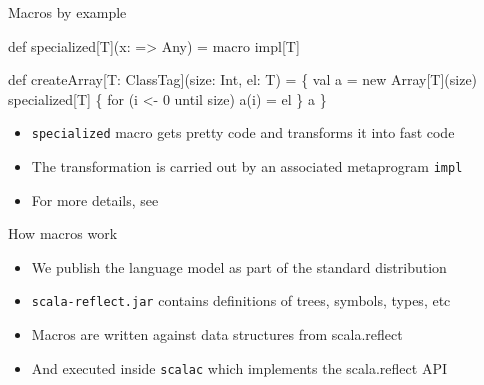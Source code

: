 \documentclass[svgnames,dvipsnames,hyperref={bookmarks=false},usepdftitle=false]{beamer}
\begin{document}
\begin{frame}[fragile]{Macros by example}

\begin{semiverbatim}
\alert{def specialized[T](x: => Any) = macro impl[T]}

def createArray[T: ClassTag](size: Int, el: T) = \{
  val a = new Array[T](size)
  \alert{specialized[T] \{}
    for (i <- 0 until size) a(i) = el
  \alert{\}}
  a
\}

\end{semiverbatim}

\begin{itemize}
\item \texttt{specialized} macro gets pretty code and transforms it into fast code
\item The transformation is carried out by an associated metaprogram \texttt{impl}
\item For more details, see 
\end{itemize}
\end{frame}

\begin{frame}{How macros work}

\begin{itemize}
\item We publish the language model as part of the standard distribution
\item \texttt{scala-reflect.jar} contains definitions of trees, symbols, types, etc
\item Macros are written against data structures from scala.reflect
\item And executed inside \texttt{scalac} which implements the scala.reflect API
\end{itemize}

\end{frame}
\end{document}
